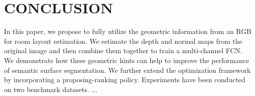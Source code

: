 \section{CONCLUSION}
\label{sec:Con}

In this paper, we propose to fully utilize the geometric information from an RGB for room layout estimation. We estimate the depth and normal maps from the original image and then combine them together to train a multi-channel FCN. We demonstrate how these geometric hints can help to improve the performance of semantic surface segmentation. We further extend the optimization framework by incorporating a proposing-ranking policy. Experiments have been conducted on two benchmark datasets. ...